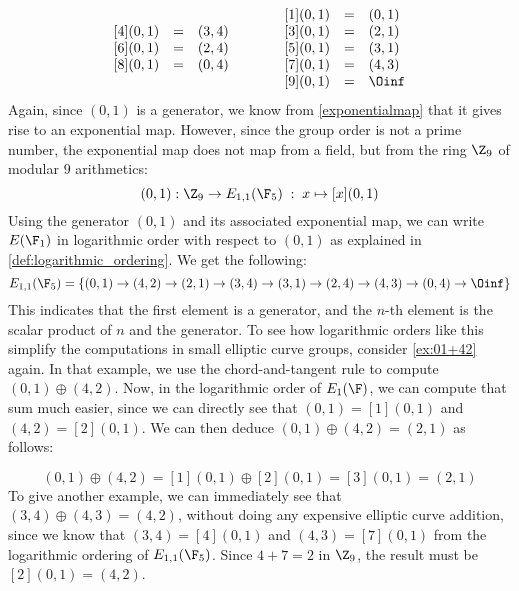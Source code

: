 \begin{example}
\begin{equation}
\begin{array}{lccr}
\begin{array}{lcl}
{}[4](0,1) &=& (3, 4) \\ 
{}[6](0,1) &=& (2, 4) \\ 
{}[8](0,1) &=& (0, 4) \\ 
\end{array} & & &
{}\begin{array}{lcl}
{}[1](0,1) &=& (0, 1) \\
{}[3](0,1) &=& (2, 1) \\
{}[5](0,1) &=& (3, 1) \\
{}[7](0,1) &=& (4, 3) \\
{}[9](0,1) &=& \Oinf
\end{array}
\end{array}
\end{equation}
Again, since $(0,1)$ is a generator, we know from \eqref{exponentialmap} that it gives rise to an exponential map. However, since the group order is not a prime number, the exponential map does not map from a field, but from the ring $\Z_9$ of modular $9$ arithmetics:
\begin{equation}
[\cdot](0,1): \Z_9 \to E_{1,1}(\F_5)\; : \; x\mapsto [x](0,1) 
\end{equation}
Using the generator $(0,1)$ and its associated exponential map, we can write $E(\F_1)$ in logarithmic order with respect to $(0,1)$ as explained in  \ref{def:logarithmic_ordering}. We get the following:
\begin{equation}
E_{1,1}(\F_5) = \{(0, 1)\to (4, 2)\to (2, 1)\to (3, 4)\to (3, 1)\to (2, 4)\to (4, 3)\to (0, 4)\to \Oinf \}
\end{equation}
This indicates that the first element is a generator, and the $n$-th element is the scalar product of $n$ and the generator. To see how logarithmic orders like this simplify the computations in small elliptic curve groups, consider \examplename{} \ref{ex:01+42} again. In that example, we use the chord-and-tangent rule to compute $(0,1)\oplus (4,2)$. Now, in the logarithmic order of $E_1(\F)$, we can compute that sum much easier, since we can directly see that $(0,1)=[1](0,1)$ and $(4,2)=[2](0,1)$. We can then deduce $(0,1)\oplus (4,2)= (2,1)$ as follows:

\begin{equation}
(0,1)\oplus (4,2)=[1](0,1)\oplus [2](0,1)= [3](0,1)=(2,1)
\end{equation}
To give another example, we can immediately see that $(3,4)\oplus (4,3) = (4,2)$, without doing any expensive elliptic curve addition, since we know that $(3,4)= [4](0,1)$ and  $(4,3)= [7](0,1)$ from the logarithmic ordering of $E_{1,1}(\F_5)$. Since $4+7 = 2$ in $\Z_9$, the result must be $[2](0,1)=(4,2)$.


\end{example}
